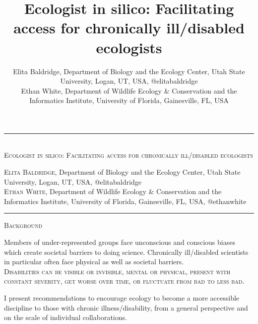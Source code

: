 \documentclass{beamer}
\author{Elita Baldridge, Department of Biology and the Ecology Center, Utah State University, Logan, UT, USA, @elitabaldridge\\Ethan White, Department of Wildlife Ecology \& Conservation and the Informatics Institute, University of Florida, Gainesville, FL, USA}
\title[17pt]{Ecologist in silico: Facilitating access for chronically ill/disabled ecologists}
\date{}
\begin{document}
\begin{flushright}

\begin{center} 
\begin{huge}
\rule{\linewidth}{3cm}
\textsc{%
\\Ecologist in silico: Facilitating access for chronically ill/disabled ecologists\\
 }
\end{huge}  
\begin{large}
\textsc{Elita Baldridge}, Department of Biology and the Ecology Center, Utah State University, Logan, UT, USA, @elitabaldridge\\  
\textsc{Ethan White}, Department of Wildlife Ecology \& Conservation and the Informatics Institute, University of Florida, Gainesville, FL, USA, @ethanwhite\\
\end{large}
\end{center}
\rule{\linewidth}{0.25cm}
\vspace{10cm}
\begin{minipage}{0.25\linewidth}
\begin{Large}
\vspace{0.5cm}
\textsc{Background}\\
\end{Large}
Members of under-represented groups face unconscious and conscious biases which create societal barriers to doing science.  Chronically ill/disabled scientists in particular often face physical as well as societal barriers.\\ 

\textsc{Disabilities can be visible or invisible, mental or physical, present with constant severity, get worse over time, or fluctuate from bad to less bad.\\ } 

I present recommendations to encourage ecology to become a more accessible discipline to those with chronic illness/disability, from a general perspective and on the scale of individual collaborations.\\


\end{minipage}
\end{flushright}
\end{document}
